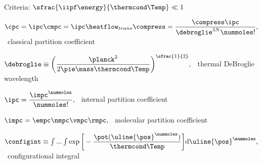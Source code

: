 \begin{bigmdframed}

    
\begin{listone}
    
    \item Criteria: $\sfrac{\iipf\energy}{\thermcond\Temp} \ll 1$
    
    \item $ \cpc = \ipc\cmpc = \ipc \heatflow_{trans} \compress = \dfrac{\compress\ipc}{\debroglie^{3N}\nummoles!},$ ~classical partition coefficient 
    
    \begin{listtwo}
    
    	\item $\debroglie \equiv \bigg(\dfrac{\planck^2}{2\pie\mass\thermcond\Temp}\bigg)^{\sfrac{1}{2}},$ ~thermal DeBroglie wavelength
  
    	\item $\ipc = \dfrac{{\impc}^{\nummoles}}{\nummoles!} ,$ ~internal partition coefficient
        
        \begin{listthree}
    
    		\item $\impc = \empc\nmpc\vmpc\rmpc ,$ ~molecular partition coefficient
    
    	\end{listthree}
    
    	\item $\configint \equiv \int...\int\exp\bigg[-\dfrac{\pot(\uline{\pos}^{\nummoles})}{\thermcond\Temp}\bigg]\mathrm{d}\uline{\pos}^{\nummoles} ,$ ~configurational integral
    
    \end{listtwo}
    
\end{listone}
    
\end{bigmdframed}